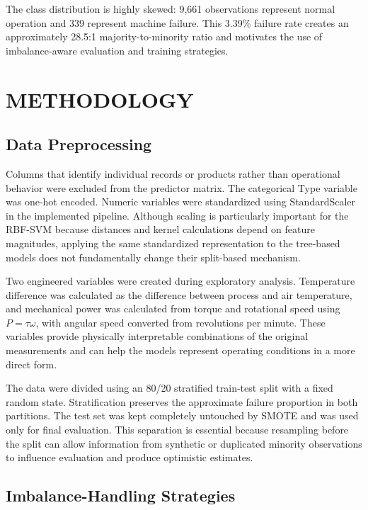 \documentclass[conference]{IEEEtran}
\begin{document}
The class distribution is highly skewed: 9,661 observations represent normal operation and 339 represent machine failure. This 3.39\% failure rate creates an approximately 28.5:1 majority-to-minority ratio and motivates the use of imbalance-aware evaluation and training strategies.

\section{METHODOLOGY}

\subsection{Data Preprocessing}

Columns that identify individual records or products rather than operational behavior were excluded from the predictor matrix. The categorical Type variable was one-hot encoded. Numeric variables were standardized using StandardScaler in the implemented pipeline. Although scaling is particularly important for the RBF-SVM because distances and kernel calculations depend on feature magnitudes, applying the same standardized representation to the tree-based models does not fundamentally change their split-based mechanism.

Two engineered variables were created during exploratory analysis. Temperature difference was calculated as the difference between process and air temperature, and mechanical power was calculated from torque and rotational speed using $P = \tau\omega$, with angular speed converted from revolutions per minute. These variables provide physically interpretable combinations of the original measurements and can help the models represent operating conditions in a more direct form.

The data were divided using an 80/20 stratified train-test split with a fixed random state. Stratification preserves the approximate failure proportion in both partitions. The test set was kept completely untouched by SMOTE and was used only for final evaluation. This separation is essential because resampling before the split can allow information from synthetic or duplicated minority observations to influence evaluation and produce optimistic estimates.

\subsection{Imbalance-Handling Strategies}
\end{document}
